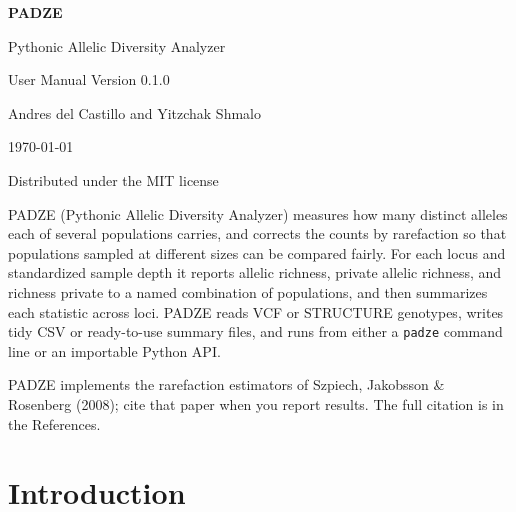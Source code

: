 \documentclass[11pt]{article}
\newcommand{\padze}{PADZE}
\begin{document}

\begin{titlepage}
\centering
\vspace*{1.25in}
{\Huge \textbf{\padze{}}\par}
\vspace{0.25in}
{\Large Pythonic Allelic Diversity Analyzer\par}
\vspace{0.25in}
{\large User Manual \textbullet{} Version 0.1.0\par}
\vspace{0.75in}
{\large Andres del Castillo and Yitzchak Shmalo\par}
\vspace{0.35in}
{\large \today\par}
\vspace{0.15in}
{\large Distributed under the MIT license\par}
\vfill
\begin{minipage}{0.86\textwidth}
\padze{} (Pythonic Allelic Diversity Analyzer) measures how many distinct
alleles each of several populations carries, and corrects the counts by
rarefaction so that populations sampled at different sizes can be compared
fairly. For each locus and standardized sample depth it reports allelic
richness, private allelic richness, and richness private to a named
combination of populations, and then summarizes each statistic across loci.
\padze{} reads VCF or STRUCTURE genotypes, writes tidy CSV or ready-to-use
summary files, and runs from either a \texttt{padze} command line or an
importable Python API.
\end{minipage}
\vfill
\begin{minipage}{0.86\textwidth}
\small
\padze{} implements the rarefaction estimators of Szpiech, Jakobsson \&
Rosenberg (2008); cite that paper when you report results. The full citation is
in the References.
\end{minipage}
\end{titlepage}

\setcounter{page}{2}
\tableofcontents
\newpage
{}

\section{Introduction}
\end{document}
